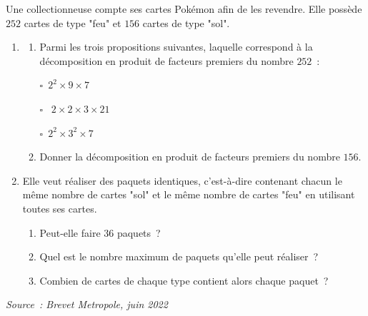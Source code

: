\documentclass[exercice]{thedocument}%
\begin{document}
%
Une collectionneuse compte ses cartes Pokémon afin de les revendre. Elle
possède $252$ cartes de type "feu" et $156$ cartes de type "sol".
\begin{enumerate}
    \item
    \begin{enumerate} 
        \item Parmi les trois propositions suivantes, laquelle correspond à la décomposition en produit de facteurs premiers du nombre $252$~:\par 
        \begin{minipage}[t]{.3\linewidth}
            $\square$\, $2^2\times 9\times 7$
        \end{minipage}\hfill
        \begin{minipage}[t]{.3\linewidth}
            $\square$ \, $2\times 2\times 3\times 21$
        \end{minipage}\hfill
        \begin{minipage}[t]{.3\linewidth}
            $\square$\, $2^2\times 3^2\times 7$
        \end{minipage}
        \item Donner la décomposition en produit de facteurs premiers du nombre $156$.
    \end{enumerate}
        \item Elle veut réaliser des paquets identiques, c'est-à-dire contenant chacun le même nombre de cartes "sol" et le même nombre de cartes "feu" en utilisant toutes ses cartes. 
    \begin{enumerate}
        \item Peut-elle faire $36$ paquets~?
        \item Quel est le nombre maximum de paquets qu'elle peut réaliser~?
        \item Combien de cartes de chaque type contient alors chaque paquet~? 
    \end{enumerate}
\end{enumerate}
\hfill\scriptsize\textit{Source~: Brevet Metropole, juin 2022}
\end{document}
